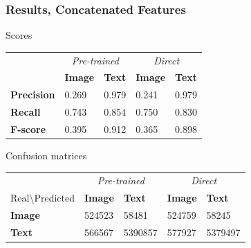 \begin{frame}
\frametitle{Results, Concatenated Features}

\begin{block}{Scores}
\begin{tabular}{l l l  | l l}
 & \multicolumn{2}{c}{\emph{Pre-trained}} & \multicolumn{2}{c}{\emph{Direct}} \\
  & \textbf{Image} & \textbf{Text} & \textbf{Image} & \textbf{Text} \\
\textbf{Precision} & 0.269 & 0.979 & 0.241 & 0.979 \\
\textbf{Recall} & 0.743 & 0.854 &  0.750 & 0.830 \\
\textbf{F-score} & 0.395 & 0.912 & 0.365 & 0.898
\end{tabular}
\end{block}

\begin{block}{Confusion matrices}
\begin{tabular}{l l l | l l }
& \multicolumn{2}{c}{\emph{Pre-trained}} & \multicolumn{2}{c}{\emph{Direct}} \\
Real\textbackslash Predicted & \textbf{Image} & \textbf{Text} & \textbf{Image} & \textbf{Text} \\
\textbf{Image} & 524523 & 58481 & 524759 & 58245 \\
\textbf{Text} & 566567 & 5390857 & 577927 & 5379497
\end{tabular}
\end{block}



\end{frame}
